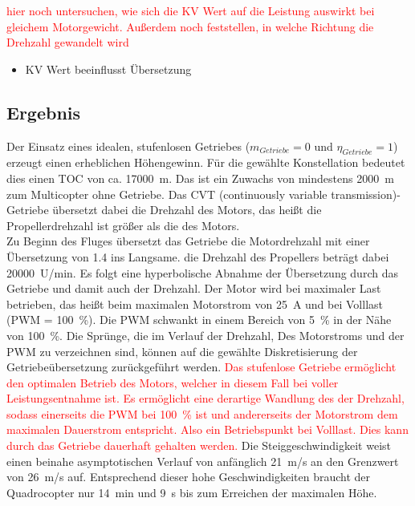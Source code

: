 \textcolor{red}{hier noch untersuchen, wie sich die KV Wert auf die Leistung auswirkt bei gleichem Motorgewicht. Außerdem noch feststellen, in welche Richtung die Drehzahl gewandelt wird}

\begin{itemize}
	\item KV Wert beeinflusst Übersetzung
\end{itemize}

\subsection{Ergebnis}
Der Einsatz eines idealen, stufenlosen Getriebes (\ensuremath{m_{Getriebe} = 0} und \ensuremath{\eta_{Getriebe} = 1}) erzeugt einen erheblichen Höhengewinn. Für die gewählte Konstellation bedeutet dies einen TOC von ca. \SI{17000}{m}. Das ist ein Zuwachs von mindestens \SI{2000}{m} zum Multicopter ohne Getriebe. Das CVT (continuously variable transmission)-Getriebe übersetzt dabei die Drehzahl des Motors, das heißt die Propellerdrehzahl ist größer als die des Motors. \\
Zu Beginn des Fluges übersetzt das Getriebe die Motordrehzahl mit einer Übersetzung von \SI{1,4}{} ins Langsame. die Drehzahl des Propellers beträgt dabei \SI{20000}{U/min}. Es folgt eine hyperbolische Abnahme der Übersetzung durch das Getriebe und damit auch der Drehzahl. Der Motor wird bei maximaler Last betrieben, das heißt beim maximalen Motorstrom von \SI{25}{A} und bei Volllast (PWM =  \SI{100}{\%}). Die PWM schwankt in einem Bereich von \SI{5}{\%} in der Nähe von \SI{100}{\%}. Die Sprünge, die im Verlauf der Drehzahl, Des Motorstroms und der PWM zu verzeichnen sind, können auf die gewählte Diskretisierung der Getriebeübersetzung zurückgeführt werden. \textcolor{red}{Das stufenlose Getriebe ermöglicht den optimalen Betrieb des Motors, welcher in diesem Fall bei voller Leistungsentnahme ist. Es ermöglicht eine derartige Wandlung des der Drehzahl, sodass einerseits die PWM bei \SI{100}{\%} ist und andererseits der Motorstrom dem maximalen Dauerstrom entspricht. Also ein Betriebspunkt bei Volllast. Dies kann durch das Getriebe dauerhaft gehalten werden.} 
Die Steiggeschwindigkeit weist einen beinahe asymptotischen Verlauf von anfänglich \SI{21}{m/s} an den Grenzwert von \SI{26}{m/s} auf. Entsprechend dieser hohe Geschwindigkeiten braucht der Quadrocopter nur \SI{14}{min} und \SI{9}{s} bis zum Erreichen der maximalen Höhe.

